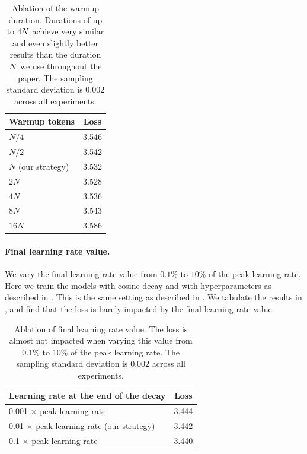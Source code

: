 \documentclass{article}
\theoremstyle{plain}
\theoremstyle{definition}
\theoremstyle{remark}
\newcommand{\maybeSubscript}[1]{
  \ifthenelse{\equal{#1}{}}{}{_{#1}}%
}
\newcommand{\params}[1][]{N\maybeSubscript{#1}}
\begin{document}
\begin{table}
    \centering
    \caption{\label{tab:warmup-ablation}Ablation of the warmup duration. Durations of up to $4\params$ achieve very similar and even slightly better results than the duration $\params$ we use throughout the paper. The sampling standard deviation is $\num{0.002}$ across all experiments.}
\renewcommand{\arraystretch}{1.15}
\begin{tabular}{lc}
    \toprule
    Warmup tokens & Loss \\
    \midrule
    $N/4$  & \num{3.546} \\
    $N/2$  & \num{3.542} \\
    $N$ (our strategy)    & \num{3.532} \\
    $2N$   & \num{3.528} \\
    $4N$   & \num{3.536} \\
    $8N$   & \num{3.543} \\
    $16N$  & \num{3.586} \\
    \bottomrule
  \end{tabular} \end{table}

\paragraph{Final learning rate value.} We vary the final learning rate value from $0.1\%$ to $10\%$ of the peak learning rate. Here we train the models with cosine decay and with hyperparameters as described in . This is the same setting as described in . We tabulate the results in , and find that the loss is barely impacted by the final learning rate value.

\begin{table}
    \centering
    \caption{\label{tab:cooldown-ablation}Ablation of final learning rate value. The loss is almost not impacted when varying this value from 0.1\% to 10\% of the peak learning rate. The sampling standard deviation is $\num{0.002}$ across all experiments.}
\renewcommand{\arraystretch}{1.15}

\begin{tabular}{lc}
    \toprule
    Learning rate at the end of the decay & Loss \\
    \midrule
    \num{0.001} $\times$ peak learning rate & \num{3.444} \\
    \num{0.01} $\times$ peak learning rate (our strategy)  & \num{3.442} \\
    \num{0.1} $\times$ peak learning rate   & \num{3.440} \\
    \bottomrule
  \end{tabular} \end{table}
\end{document}
